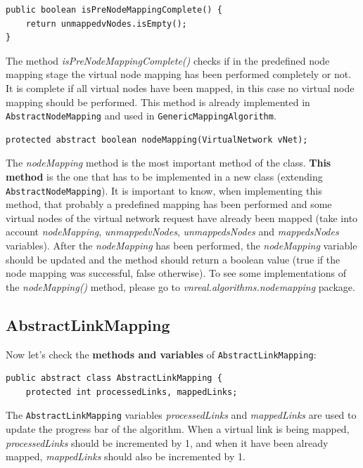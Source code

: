 \begin{lstlisting}
public boolean isPreNodeMappingComplete() {
	return unmappedvNodes.isEmpty();
}
\end{lstlisting}
The method \textsl{isPreNodeMappingComplete()} checks if in the predefined node mapping stage the virtual node mapping has been performed completely or not. It is complete if all virtual nodes have been mapped, in this case no virtual node mapping should be performed. This method is already implemented in \texttt{AbstractNodeMapping} and used in \texttt{GenericMappingAlgorithm}.

\begin{lstlisting}
protected abstract boolean nodeMapping(VirtualNetwork vNet);
\end{lstlisting}
The \textsl{nodeMapping} method is the most important method of the class. 
\textbf{This method} is the one that has to be implemented in a new class (extending \texttt{AbstractNodeMapping}). 
It is important to know, when implementing this method, that probably a predefined mapping has been performed 
and some virtual nodes of the virtual network request have already been mapped (take into account \textsl{nodeMapping}, 
\textsl{unmappedvNodes}, \textsl{unmappedsNodes} and \textsl{mappedsNodes} variables). 
After the \textsl{nodeMapping} has been performed, the \textsl{nodeMapping} variable should be updated and the method should return a boolean value (true if the node mapping was successful, false otherwise).
To see some implementations of the \textsl{nodeMapping()} method, please go to \textit{vnreal.algorithms.nodemapping} package.




\subsection{AbstractLinkMapping}
Now let's check the \textbf{methods and variables} of \texttt{AbstractLinkMapping}:
\begin{lstlisting}
public abstract class AbstractLinkMapping {
	protected int processedLinks, mappedLinks;
\end{lstlisting}
The \texttt{AbstractLinkMapping} variables \textsl{processedLinks} and \textsl{mappedLinks} are used to update the progress bar of the algorithm. 
When a virtual link is being mapped, \textsl{processedLinks} should be incremented by 1, 
and when it have been already mapped, \textsl{mappedLinks} should also be incremented by 1.



